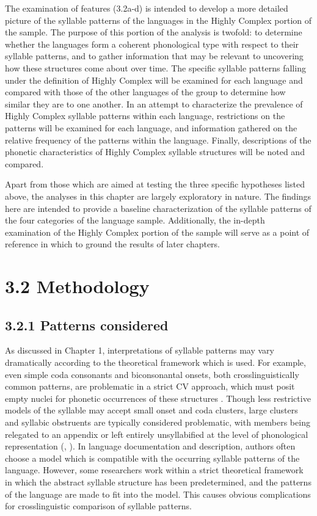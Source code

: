   The examination of features (3.2a-d) is intended to develop a more detailed picture of the syllable patterns of the languages in the Highly Complex portion of the sample. The purpose of this portion of the analysis is twofold: to determine whether the languages form a coherent phonological type with respect to their syllable patterns, and to gather information that may be relevant to uncovering how these structures come about over time. The specific syllable patterns falling under the definition of Highly Complex will be examined for each language and compared with those of the other languages of the group to determine how similar they are to one another. In an attempt to characterize the prevalence of Highly Complex syllable patterns within each language, restrictions on the patterns will be examined for each language, and information gathered on the relative frequency of the patterns within the language. Finally, descriptions of the phonetic characteristics of Highly Complex syllable structures will be noted and compared.



  Apart from those which are aimed at testing the three specific hypotheses listed above, the analyses in this chapter are largely exploratory in nature. The findings here are intended to provide a baseline characterization of the syllable patterns of the four categories of the language sample. Additionally, the in-depth examination of the Highly Complex portion of the sample will serve as a point of reference in which to ground the results of later chapters.


\section{3.2 Methodology} 
\subsection{3.2.1 Patterns considered}

  As discussed in Chapter 1, interpretations of syllable patterns may vary dramatically according to the theoretical framework which is used. For example, even simple coda consonants and biconsonantal onsets, both crosslinguistically common patterns, are problematic in a strict CV approach, which must posit empty nuclei for phonetic occurrences of these structures \citep{Lowenstamm1996}. Though less restrictive models of the syllable may accept small onset and coda clusters, large clusters and syllabic obstruents are typically considered problematic, with members being relegated to an appendix or left entirely unsyllabified at the level of phonological representation (\citealt{VauxWolfe2009}, \citealt{Bagemihl1991}). In language documentation and description, authors often choose a model which is compatible with the occurring syllable patterns of the language. However, some researchers work within a strict theoretical framework in which the abstract syllable structure has been predetermined, and the patterns of the language are made to fit into the model. This causes obvious complications for crosslinguistic comparison of syllable patterns.



